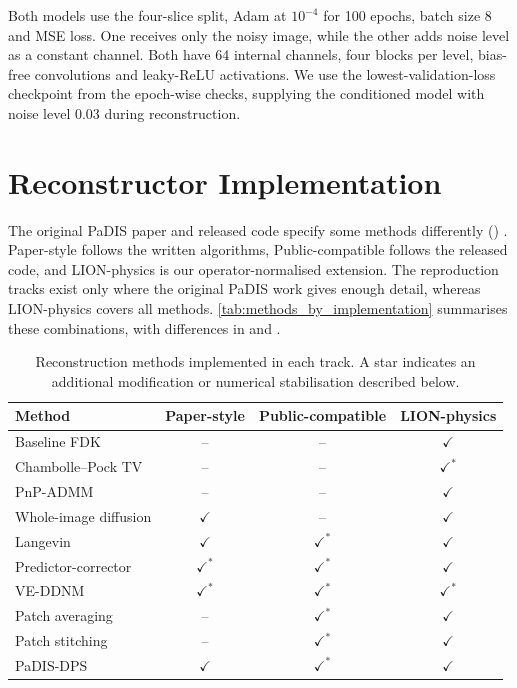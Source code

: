 Both models use the four-slice split, Adam at $10^{-4}$ for 100 epochs, batch size 8 and MSE loss. One receives only the noisy image, while the other adds noise level as a constant channel. Both have 64 internal channels, four blocks per level, bias-free convolutions and leaky-ReLU activations. We use the lowest-validation-loss checkpoint from the epoch-wise checks, supplying the conditioned model with noise level 0.03 during reconstruction.

\section{Reconstructor Implementation}
\label{sec:methods-reconstructor-implementation}

The original PaDIS paper and released code specify some methods differently () \cite{}. Paper-style follows the written algorithms, Public-compatible follows the released code, and LION-physics is our operator-normalised extension. The reproduction tracks exist only where the original PaDIS work gives enough detail, whereas LION-physics covers all methods. \autoref{tab:methods_by_implementation} summarises these combinations, with differences in  and .

\begin{table}[ht]
  \centering
  \caption[Reconstruction methods by implementation track.]{Reconstruction methods implemented in each track. A star indicates an additional modification or numerical stabilisation described below.}
  \label{tab:methods_by_implementation}
  \begin{tabular}{lccc}
  \hline
  \textbf{Method} & \textbf{Paper-style} & \textbf{Public-compatible} & \textbf{LION-physics} \\
  \hline
  Baseline FDK              & --             & --             & \(\checkmark\) \\
  Chambolle--Pock TV        & --             & --             & \(\checkmark^*\) \\
  PnP-ADMM                  & --             & --             & \(\checkmark\) \\
  Whole-image diffusion     & \(\checkmark\) & --             & \(\checkmark\) \\
  Langevin                  & \(\checkmark\) & \(\checkmark^*\) & \(\checkmark\) \\
  Predictor-corrector       & \(\checkmark^*\) & \(\checkmark^*\) & \(\checkmark\) \\
  VE-DDNM                   & \(\checkmark^*\) & \(\checkmark^*\) & \(\checkmark^*\) \\
  Patch averaging           & --             & \(\checkmark^*\) & \(\checkmark\) \\
  Patch stitching           & --             & \(\checkmark^*\) & \(\checkmark\) \\
  PaDIS-DPS                 & \(\checkmark\) & \(\checkmark^*\) & \(\checkmark\) \\
  \hline
  \end{tabular}
\end{table}

